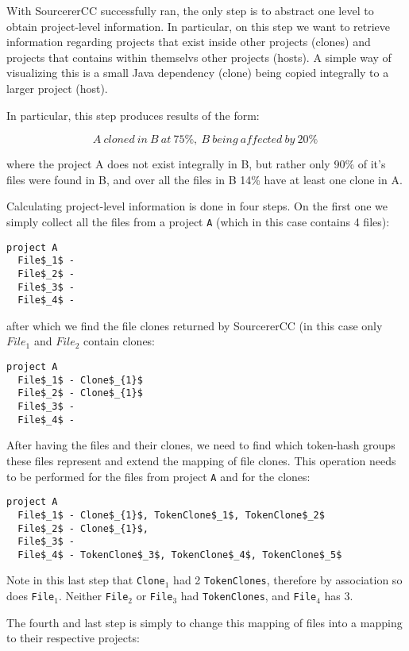 With SourcererCC successfully ran, the only step is to abstract one level to obtain project-level information. In particular, on this step we want to retrieve information regarding projects that exist inside other projects (clones) and projects that contains within themselvs other projects (hosts). A simple way of visualizing this is a small Java dependency (clone) being copied integrally to a larger project (host).

In particular, this step produces results of the form:

$$ A\ cloned\ in\ B\ at\ 75\%,\ B\ being\ affected\ by\ 20\%\ $$

where the project A does not exist integrally in B, but rather only 90\% of it's files were found in B, and over all the files in B 14\% have at least one clone in A.

Calculating project-level information is done in four steps. On the first one we simply collect all the files from a project \texttt{A} (which in this case contains 4 files):

\begin{lstlisting}[mathescape, numbers=none]
project A
  File$_1$ - 
  File$_2$ - 
  File$_3$ - 
  File$_4$ - 
\end{lstlisting}
%
after which we find the file clones returned by SourcererCC (in this case only $File_1$ and $File_2$ contain clones:
\begin{lstlisting}[mathescape, numbers=none]
project A
  File$_1$ - Clone$_{1}$
  File$_2$ - Clone$_{1}$
  File$_3$ - 
  File$_4$ - 
\end{lstlisting}
%
After having the files and their clones, we need to find which token-hash groups these files represent and extend the mapping of file clones. This operation needs to be performed for the files from project \texttt{A} and for the clones:

\begin{lstlisting}[mathescape, numbers=none]
project A
  File$_1$ - Clone$_{1}$, TokenClone$_1$, TokenClone$_2$
  File$_2$ - Clone$_{1}$,
  File$_3$ - 
  File$_4$ - TokenClone$_3$, TokenClone$_4$, TokenClone$_5$
\end{lstlisting}
%
Note in this last step that \texttt{Clone}$_1$ had 2 \texttt{TokenClones}, therefore by association so does \texttt{File}$_1$. Neither \texttt{File}$_2$ or \texttt{File}$_3$ had \texttt{TokenClones}, and \texttt{File}$_4$ has 3.

The fourth and last step is simply to change this mapping of files into a mapping to their respective projects:

